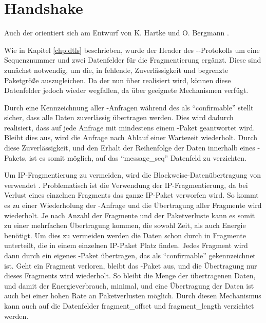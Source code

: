 \section{Handshake}
\label{sec:handshake}

Auch der  orientiert sich am Entwurf von K. Hartke und O. Bergmann \cite[Kapitel 4]{draftcodtls}.

Wie in Kapitel \ref{chp:dtls} beschrieben, wurde der Header des --Protokolls um eine Sequenznummer
und zwei Datenfelder für die Fragmentierung ergänzt. Diese sind zunächst notwendig, um die, in  fehlende, Zuverlässigkeit
und begrenzte Paketgröße auszugleichen. Da der  nun über  realisiert wird, können diese Datenfelder jedoch
wieder wegfallen, da  über geeignete Mechanismen verfügt.

Durch eine Kennzeichnung aller -Anfragen während des  als "`confirmable"' stellt  sicher, dass
alle Daten zuverlässig übertragen werden. Dies wird dadurch realisiert, dass auf jede Anfrage mit mindestens einem -Paket
geantwortet wird. Bleibt dies aus, wird die Anfrage nach Ablauf einer Wartezeit wiederholt. Durch diese Zuverlässigkeit, und den
Erhalt der Reihenfolge der Daten innerhalb eines -Pakets, ist es somit möglich, auf das "`message\_seq"' Datenfeld zu verzichten.

Um IP-Fragmentierung zu vermeiden, wird die Blockweise-Datenübertragung von  verwendet \cite{draftcoapblock}. Problematisch ist die Verwendung
der IP-Fragmentierung, da bei Verlust eines einzelnen Fragments das ganze IP-Paket verworfen wird. So kommt es zu einer Wiederholung
der -Anfrage und die Übertragung aller Fragmente wird wiederholt. Je nach Anzahl der Fragmente und der Paketverluste kann
es somit zu einer mehrfachen Übertragung kommen, die sowohl Zeit, als auch Energie benötigt. Um dies zu vermeiden werden die Daten schon
durch  in Fragmente unterteilt, die in einem einzelnen IP-Paket Platz finden. Jedes Fragment wird dann durch ein eigenes
-Paket übertragen, das als "`confirmable"' gekennzeichnet ist. Geht ein Fragment verloren, bleibt das -Paket aus,
und die Übertragung nur dieses Fragments wird wiederholt. So bleibt die Menge der übertragenen Daten, und damit der Energieverbrauch,
minimal, und eine Übertragung der Daten ist auch bei einer hohen Rate an Paketverlusten möglich. Durch diesen Mechanismus kann auch
auf die Datenfelder fragment\_offset und fragment\_length verzichtet werden.


